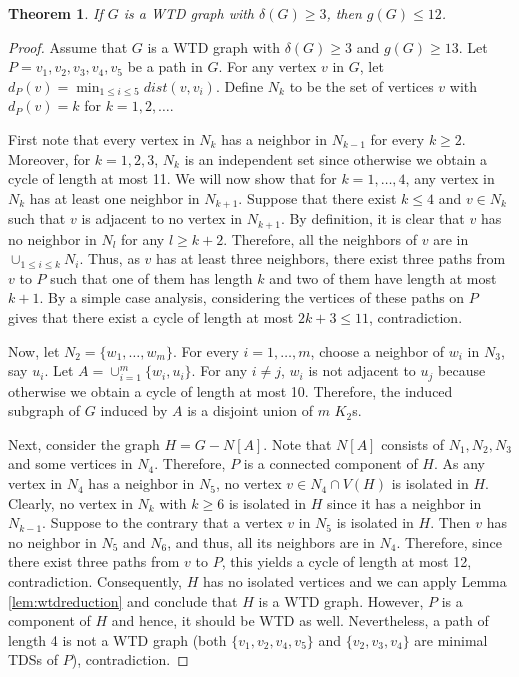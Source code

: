 \documentclass[11pt]{article}
\newtheorem{theorem}{Theorem}[section]
\theoremstyle{definition}
\begin{document}
\begin{theorem}\label{thm:wtdmindeg3}
If $G$ is a WTD graph with $\delta (G)\geq 3$,
then $g(G)\leq 12$.
\end{theorem}
\begin{proof}
Assume that $G$ is a WTD graph with $\delta (G)\geq 3$ and $g(G)\geq 13$.
Let $P=v_1,v_2,v_3,v_4,v_5$ be a path in $G$.
For any vertex $v$ in $G$, let $d_P(v)=\min_{1\leq i \leq 5} dist(v,v_i)$.
Define $N_k$ to be the set of vertices $v$ with $d_P(v)=k$ for $k=1,2,\dots .$

First note that every vertex in $N_k$ has a neighbor in $N_{k-1}$ for every $k\geq 2$.
Moreover, for $k=1,2,3$, $N_k$ is an independent set since otherwise we obtain a cycle of length at most 11.
We will now show that for $k=1,\dots,4$, any vertex in $N_k$ has at least one neighbor in $N_{k+1}$. 
Suppose that there exist $k\leq 4$ and $v\in N_k$ such that $v$ is adjacent to no vertex in $N_{k+1}$.
By definition, it is clear that $v$ has no neighbor in $N_l$ for any $l\geq k+2$.
Therefore, all the neighbors of $v$ are in $\cup_{1\leq i \leq k} N_i$.
Thus, as $v$ has at least three neighbors, there exist three paths from $v$ to $P$ such that one of them has length $k$ and two of them have length at most $k+1$.
By a simple case analysis, considering the vertices of these paths on $P$ gives that there exist a cycle of length at most $2k+3\leq 11$, contradiction.

Now, let $N_2=\{w_1,\dots ,w_m\}$.
For every $i=1,\dots,m$, choose a neighbor of $w_i$ in $N_3$, say $u_i$.
Let $A=\cup_{i=1}^m \{w_i,u_i\}$.
For any $i\neq j$, $w_i$ is not adjacent to $u_j$ because otherwise we obtain a cycle of length at most 10.
Therefore, the induced subgraph of $G$ induced by $A$ is a disjoint union of $m$ $K_2$s.

Next, consider the graph $H=G-N[A]$.
Note that $N[A]$ consists of $N_1,N_2,N_3$ and some vertices in $N_4$.
Therefore, $P$ is a connected component of $H$.
As any vertex in $N_4$ has a neighbor in $N_5$, no vertex $v \in N_4 \cap V(H)$ is isolated in $H$.
Clearly, no vertex in $N_k$ with $k\geq 6$ is isolated in $H$ since it has a neighbor in $N_{k-1}$.
Suppose to the contrary that a vertex $v$ in $N_5$ is isolated in $H$.
Then $v$ has no neighbor in $N_5$ and $N_6$, and thus,
all its neighbors are in $N_4$.
Therefore, since there exist three paths from $v$ to $P$, this yields a cycle of length at most 12, contradiction. Consequently, $H$ has no isolated vertices and we can apply Lemma \ref{lem:wtdreduction} and conclude that $H$ is a WTD graph. However, $P$ is a component of $H$ and hence, it should be WTD as well.
Nevertheless, a path of length 4 is not a WTD graph (both $\{v_1,v_2,v_4,v_5\}$ and $\{v_2,v_3,v_4\}$ are minimal TDSs of $P$), contradiction.
\end{proof}
\end{document}
